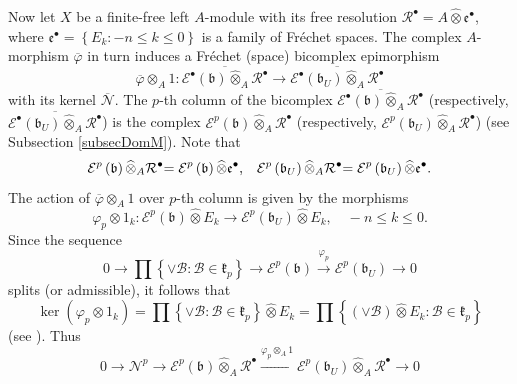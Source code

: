 \documentclass[12pt]{amsart}%
\theoremstyle{plain}
\numberwithin{equation}{section}
\numberwithin{equation}{section}
\numberwithin{theorem}{section}
\numberwithin{lemma}{section}
\numberwithin{remark}{section}
\numberwithin{example}{section}
\numberwithin{proposition}{section}
\numberwithin{definition}{section}
\numberwithin{corollary}{section}
\begin{document}
Now let $X$ be a finite-free left $A$-module with its free resolution
$\mathcal{R}^{\bullet}=A\widehat{\otimes}\mathfrak{e}^{\bullet}$, where
$\mathfrak{e}^{\bullet}=\left\{  E_{k}:-n\leq k\leq0\right\}  $ is a family of
Fr\'{e}chet spaces. The complex $A$-morphism $\overline{\varphi}$ in turn
induces a Fr\'{e}chet (space) bicomplex epimorphism
\[
\overline{\varphi}\otimes_{A}1:\overline{\mathcal{E}^{\bullet}\left(
\mathfrak{b}\right)  \widehat{\otimes}_{A}\mathcal{R}^{\bullet}}%
\rightarrow\overline{\mathcal{E}^{\bullet}\left(  \mathfrak{b}_{U}\right)
\widehat{\otimes}_{A}\mathcal{R}^{\bullet}}%
\]
with its kernel $\overline{\mathcal{N}}$. The $p$-th column of the bicomplex
$\overline{\mathcal{E}^{\bullet}\left(  \mathfrak{b}\right)  \widehat{\otimes
}_{A}\mathcal{R}^{\bullet}}$ (respectively, $\overline{\mathcal{E}^{\bullet
}\left(  \mathfrak{b}_{U}\right)  \widehat{\otimes}_{A}\mathcal{R}^{\bullet}}%
$) is the complex $\mathcal{E}^{p}\left(  \mathfrak{b}\right)
\widehat{\otimes}_{A}\mathcal{R}^{\bullet}$ (respectively, $\mathcal{E}%
^{p}\left(  \mathfrak{b}_{U}\right)  \widehat{\otimes}_{A}\mathcal{R}%
^{\bullet}$) (see Subsection \ref{subsecDomM}). Note that%
\[
\mathcal{E}^{p}\left(  \mathfrak{b}\right)  \widehat{\otimes}_{A}%
\mathcal{R}^{\bullet}\mathcal{=E}^{p}\left(  \mathfrak{b}\right)
\widehat{\otimes}\mathfrak{e}^{\bullet}\text{,\quad}\mathcal{E}^{p}\left(
\mathfrak{b}_{U}\right)  \widehat{\otimes}_{A}\mathcal{R}^{\bullet
}\mathcal{=E}^{p}\left(  \mathfrak{b}_{U}\right)  \widehat{\otimes
}\mathfrak{e}^{\bullet}.
\]
The action of $\overline{\varphi}\otimes_{A}1$ over $p$-th column is given by
the morphisms%
\[
\varphi_{p}\otimes1_{k}:\mathcal{E}^{p}\left(  \mathfrak{b}\right)
\widehat{\otimes}E_{k}\rightarrow\mathcal{E}^{p}\left(  \mathfrak{b}%
_{U}\right)  \widehat{\otimes}E_{k},\quad-n\leq k\leq0.
\]
Since the sequence
\[
0\rightarrow\prod\left\{  \vee\mathcal{B}:\mathcal{B}\in\mathfrak{k}%
_{p}\right\}  \rightarrow\mathcal{E}^{p}\left(  \mathfrak{b}\right)
\overset{\varphi_{p}}{\longrightarrow}\mathcal{E}^{p}\left(  \mathfrak{b}%
_{U}\right)  \rightarrow0
\]
splits (or admissible), it follows that
\[
\ker\left(  \varphi_{p}\otimes1_{k}\right)  =\prod\left\{  \vee\mathcal{B}%
:\mathcal{B}\in\mathfrak{k}_{p}\right\}  \widehat{\otimes}E_{k}=\prod\left\{
\left(  \vee\mathcal{B}\right)  \widehat{\otimes}E_{k}:\mathcal{B}%
\in\mathfrak{k}_{p}\right\}
\]
(see \cite[2.5.19]{HelHom}). Thus
\[
0\rightarrow\mathcal{N}^{p}\rightarrow\mathcal{E}^{p}\left(  \mathfrak{b}%
\right)  \widehat{\otimes}_{A}\mathcal{R}^{\bullet}\overset{\varphi_{p}%
\otimes_{A}1}{\longrightarrow}\mathcal{E}^{p}\left(  \mathfrak{b}_{U}\right)
\widehat{\otimes}_{A}\mathcal{R}^{\bullet}\rightarrow0
\]
\end{document}
